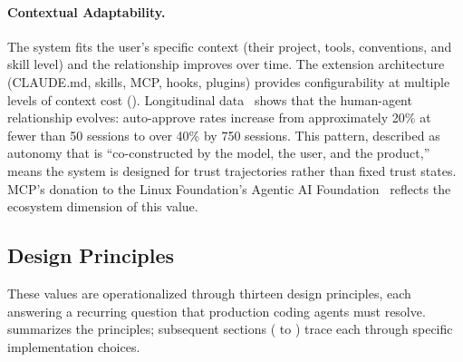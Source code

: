 \paragraph{Contextual Adaptability.}
The system fits the user's specific context (their project, tools, conventions, and skill level) and the relationship improves over time. The extension architecture (CLAUDE.md, skills, MCP, hooks, plugins) provides configurability at multiple levels of context cost (). Longitudinal data~\citep{anthropic2026autonomy} shows that the human-agent relationship evolves: auto-approve rates increase from approximately 20\% at fewer than 50 sessions to over 40\% by 750 sessions. This pattern, described as autonomy that is ``co-constructed by the model, the user, and the product,'' means the system is designed for trust trajectories rather than fixed trust states. MCP's donation to the Linux Foundation's Agentic AI Foundation~\citep{linuxfoundation2025aaif} reflects the ecosystem dimension of this value.

\subsection{Design Principles}
\label{sec:values:principles}

These values are operationalized through thirteen design principles, each answering a recurring question that production coding agents must resolve.  summarizes the principles; subsequent sections ( to ) trace each through specific implementation choices.


